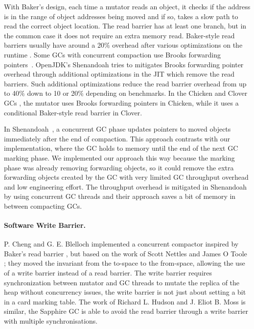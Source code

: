 \documentclass[sigplan,10pt,screen]{acmart}\settopmatter{printfolios=true,printccs=true,printacmref=true}
\newcommand{\todo}[1]{\color{orange}\fbox{\bfseries\sffamily\scriptsize TODO:}{\sf\small$\blacktriangleright$\textit{#1}$\blacktriangleleft$}\color{black}}
\begin{document}
With Baker's design, each time a mutator reads an object, it checks if the address is in the range of object addresses being moved and if so, takes a slow path to read the correct object location. The read barrier has at least one branch, but in the common case it does not require an extra memory read. Baker-style read barriers usually have around a 20\% overhead after various optimizations on the runtime \cite{BarrierMethods}.
Some GCs with concurrent compaction use Brooks forwarding pointers~\cite{MetronomeIBMGC,RTGCBrooksReadBarrier,Shenandoah}.
OpenJDK's Shenandoah \cite{Shenandoah} tries to mitigates Brooks forwarding pointer overhead through additional optimizations in the JIT which remove the read barriers. Such additional optimizations reduce the read barrier overhead from up to 40\% down to 10 or 20\% depending on benchmarks. In the Chicken and Clover GCs \cite{RTConcCompactGC}, the mutator uses Brooks forwarding pointers in Chicken, while it uses a conditional Baker-style read barrier in Clover.

In Shenandoah~\cite{Shenandoah}, a concurrent GC phase updates pointers to moved objects immediately after the end of compaction. This approach contrasts with our implementation, where the GC holds to memory until the end of the next GC marking phase. We implemented our approach this way because the marking phase was already removing forwarding objects, so it could remove the extra forwarding objects created by the GC with very limited GC throughput overhead and low engineering effort. The throughput overhead is mitigated in Shenandoah by using concurrent GC threads and their approach saves a bit of memory in between compacting GCs.

\paragraph{Software Write Barrier.}
P. Cheng and G. E. Blelloch \cite{WBConcCompactNew} implemented a concurrent compactor inspired by Baker's read barrier \cite{BakerReadBarrier}, but based on the work of Scott Nettles and James O Toole \cite{WBConcCompactOld}; they moved the invariant from the to-space to the from-space, allowing the use of a write barrier instead of a read barrier. 
The write barrier requires synchronization between mutator and GC threads to mutate the replica of the heap without concurrency issues, the write barrier is not just about setting a bit in a card marking table. The work of Richard L. Hudson and J. Eliot B. Moss \cite{SapphireConcCompactNoRB} is similar, the Sapphire GC is able to avoid the read barrier through a write barrier with multiple synchronisations.
\end{document}
